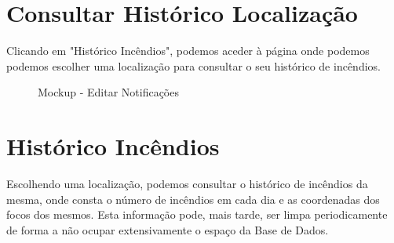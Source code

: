 \documentclass[a4paper,12pt]{scrreprt}
\newcommand{\tab}{
    \hspace{1cm}}
\begin{document}
\section{Consultar Histórico Localização}

\tab Clicando em "Histórico Incêndios", podemos aceder à página onde podemos podemos escolher uma localização para consultar o seu histórico de incêndios.

\vspace{1cm}

\begin{figure}[hbt!]
    \centering
    \caption{Mockup - Editar Notificações}
\end{figure}
\clearpage

\section{Histórico Incêndios}

\tab Escolhendo uma localização, podemos consultar o histórico de incêndios da mesma, onde consta o número de incêndios em cada dia e as coordenadas dos focos dos mesmos. Esta informação pode, mais tarde, ser limpa periodicamente de forma a não ocupar extensivamente o espaço da Base de Dados.

\vspace{1cm}
\end{document}
